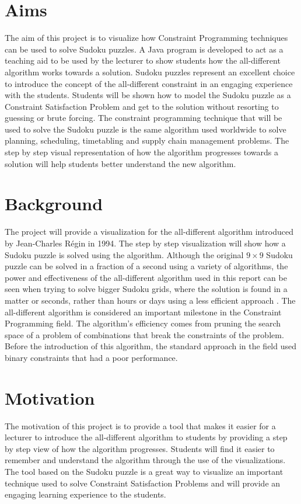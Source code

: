 \documentclass{l4proj}
\begin{document}
\section{Aims}
\noindent The aim of this project is to visualize how Constraint Programming techniques can be used to solve Sudoku puzzles. A Java program is developed to act as a teaching aid to be used by the lecturer to show students how the all-different algorithm works towards a solution. Sudoku puzzles represent an excellent choice to introduce the concept of the all-different constraint in an engaging experience with the students. Students will be shown how to model the Sudoku puzzle as a Constraint Satisfaction Problem and get to the solution without resorting to guessing or brute forcing. The constraint programming technique that will be used to solve the Sudoku puzzle is the same algorithm used worldwide to solve planning, scheduling, timetabling and supply chain management problems. The step by step visual representation of how the algorithm progresses towards a solution will help students better understand the new algorithm.

\section{Background}
The project will provide a visualization for the all-different algorithm introduced by Jean-Charles R\'egin \cite{regin1994filtering} in 1994. The step by step visualization will show how a Sudoku puzzle is solved using the algorithm. Although the original $9 \times 9$ Sudoku puzzle can be solved in a fraction of a second using a variety of algorithms, the power and effectiveness of the all-different algorithm used in this report can be seen when trying to solve bigger Sudoku grids, where the solution is found in a matter or seconds, rather than hours or days using a less efficient approach \cite{stergiou1999difference}. The all-different algorithm is considered an important milestone in the Constraint Programming field. The algorithm's efficiency comes from pruning the search space of a problem of combinations that break the constraints of the problem. Before the introduction of this algorithm, the standard approach in the field used binary constraints that had a poor performance.

\section{Motivation}
The motivation of this project is to provide a tool that makes it easier for a lecturer to introduce the all-different algorithm to students by providing a step by step view of how the algorithm progresses. Students will find it easier to remember and understand the algorithm through the use of the visualizations. The tool based on the Sudoku puzzle is a great way to visualize an important technique used to solve Constraint Satisfaction Problems and will provide an engaging learning experience to the students.
\end{document}
